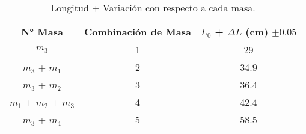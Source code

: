 \documentclass[../main.tex]{subfiles}
\begin{document}
\begin{table}[H]
    \centering
    \begin{tabular}{c|c|c}
        \hline
        N° Masa & Combinación de Masa & $L_0$ + $\Delta L$ (cm) $\pm 0.05$\\
        \hline
        $m_3$                 & 1 & 29\\
        $m_3$ + $m_1$         & 2 & 34.9\\
        $m_3$ + $m_2$         & 3 & 36.4\\
        $m_1$ + $m_2$ + $m_3$ & 4 & 42.4\\
        $m_3$ + $m_4$         & 5 & 58.5\\
        \hline
    \end{tabular}
    \caption{Longitud + Variación con respecto a cada masa.}
\end{table}
\end{document}
